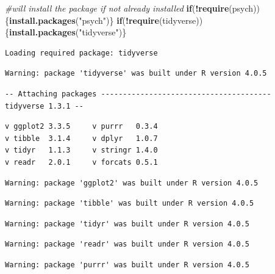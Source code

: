 \documentclass[
  english,
]{book}
\newenvironment{Shaded}{\begin{snugshade}}{\end{snugshade}}
\newcommand{\CommentTok}[1]{\textcolor[rgb]{0.56,0.35,0.01}{\textit{#1}}}
\newcommand{\ControlFlowTok}[1]{\textcolor[rgb]{0.13,0.29,0.53}{\textbf{#1}}}
\newcommand{\KeywordTok}[1]{\textcolor[rgb]{0.13,0.29,0.53}{\textbf{#1}}}
\newcommand{\NormalTok}[1]{#1}
\newcommand{\OperatorTok}[1]{\textcolor[rgb]{0.81,0.36,0.00}{\textbf{#1}}}
\newcommand{\StringTok}[1]{\textcolor[rgb]{0.31,0.60,0.02}{#1}}
\begin{document}
\begin{Shaded}
\begin{Highlighting}[]
\CommentTok{#will install the package if not already installed}
\ControlFlowTok{if}\NormalTok{(}\OperatorTok{!}\KeywordTok{require}\NormalTok{(psych))\{}\KeywordTok{install.packages}\NormalTok{(}\StringTok{"psych"}\NormalTok{)\}}
\ControlFlowTok{if}\NormalTok{(}\OperatorTok{!}\KeywordTok{require}\NormalTok{(tidyverse))\{}\KeywordTok{install.packages}\NormalTok{(}\StringTok{"tidyverse"}\NormalTok{)\}}
\end{Highlighting}
\end{Shaded}

\begin{verbatim}
Loading required package: tidyverse
\end{verbatim}

\begin{verbatim}
Warning: package 'tidyverse' was built under R version 4.0.5
\end{verbatim}

\begin{verbatim}
-- Attaching packages --------------------------------------- tidyverse 1.3.1 --
\end{verbatim}

\begin{verbatim}
v ggplot2 3.3.5     v purrr   0.3.4
v tibble  3.1.4     v dplyr   1.0.7
v tidyr   1.1.3     v stringr 1.4.0
v readr   2.0.1     v forcats 0.5.1
\end{verbatim}

\begin{verbatim}
Warning: package 'ggplot2' was built under R version 4.0.5
\end{verbatim}

\begin{verbatim}
Warning: package 'tibble' was built under R version 4.0.5
\end{verbatim}

\begin{verbatim}
Warning: package 'tidyr' was built under R version 4.0.5
\end{verbatim}

\begin{verbatim}
Warning: package 'readr' was built under R version 4.0.5
\end{verbatim}

\begin{verbatim}
Warning: package 'purrr' was built under R version 4.0.5
\end{verbatim}
\end{document}
